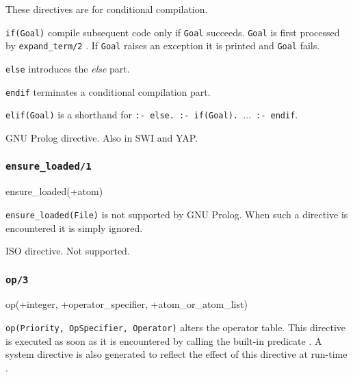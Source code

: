 \Description

These directives are for conditional compilation.

\texttt{if(Goal)} compile subsequent code only if \texttt{Goal}
succeeds. \texttt{Goal} is first processed by \texttt{expand\_term/2}
.  If \texttt{Goal} raises an exception it is printed
and \texttt{Goal} fails.

\texttt{else} introduces the \textit{else} part.

\texttt{endif} terminates a conditional compilation part.

\texttt{elif(Goal)} is a shorthand for \texttt{:- else. :- if(Goal). $\ldots$ :- endif}.

\Portability

GNU Prolog directive. Also in SWI and YAP.


\subsubsection{\texttt{ensure\_loaded/1}}

\begin{TemplatesOneCol}
ensure\_loaded(+atom)

\end{TemplatesOneCol}

\Description

\texttt{ensure\_loaded(File)} is not supported by GNU Prolog. When such a
directive is encountered it is simply ignored.

\Portability

ISO directive. Not supported.

\subsubsection{\texttt{op/3}}
\label{op/3}

\begin{TemplatesOneCol}
op(+integer, +operator\_specifier, +atom\_or\_atom\_list)

\end{TemplatesOneCol}

\Description

\texttt{op(Priority, OpSpecifier, Operator)} alters the operator table. This
directive is executed as soon as it is encountered by calling the built-in
predicate  . A system
directive is also generated to reflect the effect of this directive at
run-time .

